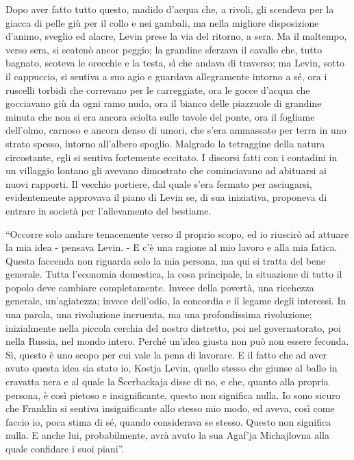 Dopo aver fatto tutto questo, madido d'acqua che, a rivoli, gli scendeva per la giacca di pelle giù per il collo e nei gambali, ma nella migliore disposizione d'animo, sveglio ed alacre, Levin prese la via del ritorno, a sera. Ma il maltempo, verso sera, si scatenò ancor peggio; la grandine sferzava il cavallo che, tutto bagnato, scoteva le orecchie e la testa, sì che andava di traverso; ma Levin, sotto il cappuccio, si sentiva a suo agio e guardava allegramente intorno a sé, ora i ruscelli torbidi che correvano per le carreggiate, ora le gocce d'acqua che gocciavano giù da ogni ramo nudo, ora il bianco delle piazzuole di grandine minuta che non si era ancora sciolta sulle tavole del ponte, ora il fogliame dell'olmo, carnoso e ancora denso di umori, che s'era ammassato per terra in uno strato spesso, intorno all'albero spoglio. Malgrado la tetraggine della natura circostante, egli si sentiva fortemente eccitato. I discorsi fatti con i contadini in un villaggio lontano gli avevano dimostrato che cominciavano ad abituarsi ai nuovi rapporti. Il vecchio portiere, dal quale s'era fermato per asciugarsi, evidentemente approvava il piano di Levin se, di sua iniziativa, proponeva di entrare in società per l'allevamento del bestiame. 

``Occorre solo andare tenacemente verso il proprio scopo, ed io riuscirò ad attuare la mia idea - pensava Levin. - E c'è una ragione al mio lavoro e alla mia fatica. Questa faccenda non riguarda solo la mia persona, ma qui si tratta del bene generale. Tutta l'economia domestica, la cosa principale, la situazione di tutto il popolo deve cambiare completamente. Invece della povertà, una ricchezza generale, un'agiatezza; invece dell'odio, la concordia e il legame degli interessi. In una parola, una rivoluzione incruenta, ma una profondissima rivoluzione; inizialmente nella piccola cerchia del nostro distretto, poi nel governatorato, poi nella Russia, nel mondo intero. Perché un'idea giusta non può non essere feconda. Sì, questo è uno scopo per cui vale la pena di lavorare. E il fatto che ad aver avuto questa idea sia stato io, Kostja Levin, quello stesso che giunse al ballo in cravatta nera e al quale la Šcerbackaja disse di no, e che, quanto alla propria persona, è così pietoso e insignificante, questo non significa nulla. Io sono sicuro che Franklin si sentiva insignificante allo stesso mio modo, ed aveva, così come faccio io, poca stima di sé, quando considerava se stesso. Questo non significa nulla. E anche lui, probabilmente, avrà avuto la sua Agaf'ja Michajlovna alla quale confidare i suoi piani''. 

